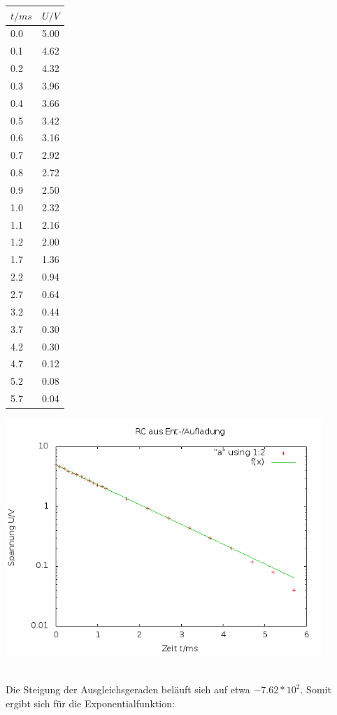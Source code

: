 \begin{minipage}{0.2\textwidth}
\begin{tabular}{l|r}
$t/ms$ & $U/V$\\
\hline
0.0 &	5.00\\
0.1 &	4.62\\
0.2 &	4.32\\
0.3 &	3.96\\
0.4 &	3.66\\
0.5 &	3.42\\
0.6 &	3.16\\
0.7 &	2.92\\
0.8 &	2.72\\
0.9 &	2.50\\
1.0 &	2.32\\
1.1 &	2.16\\
1.2 &	2.00\\
1.7 &	1.36\\
2.2 &	0.94\\
2.7 &	0.64\\
3.2 &	0.44\\
3.7 &	0.30\\
4.2 &	0.30\\
4.7 &	0.12\\
5.2 &	0.08\\
5.7 &	0.04 
\end{tabular}
\end{minipage}
\hspace{0.5 cm}
\begin{minipage}{0.8\textwidth}
\includegraphics [width=12cm] {_pics/RC1.png}
\end{minipage}\\


Die Steigung der Ausgleichsgeraden beläuft sich auf etwa $-7.62*10^2$. Somit ergibt sich für die Exponentialfunktion:

